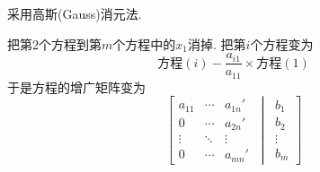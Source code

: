 采用高斯(Gauss)消元法.


把第$2$个方程到第$m$个方程中的$x_1$消掉. 把第$i$个方程变为
\begin{equation}
  \text{方程}(i) - \frac{a_{i 1}}{a_{11}} \times \text{方程}(1)
\end{equation}
于是方程的增广矩阵变为
\begin{equation}
  \left[
    \begin{matrix}
        a_{11}&\cdots&a_{1n}'\\
        0&\cdots&a_{2n}'\\
        \vdots&\ddots&\vdots\\
        0&\cdots&a_{m n}'
    \end{matrix}
    \ 
  \middle|
    \ 
    \begin{matrix} 
    b_1 \\ 
    b_2 \\ 
    \vdots \\ 
    b_m
    \end{matrix}
  \right] 
\end{equation}